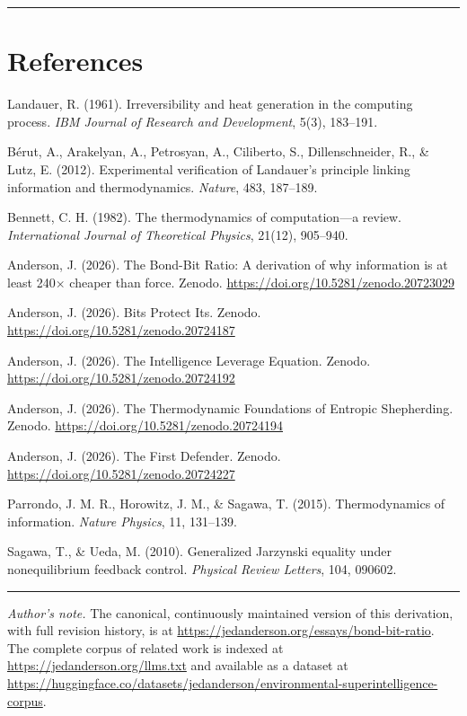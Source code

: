 \documentclass[11pt]{article}
\begin{document}
\vspace{0.8em}
\begin{center}\rule{0.45\textwidth}{0.4pt}\end{center}
\vspace{0.4em}

\section*{References}
\begin{list}{}{\setlength{\leftmargin}{1.6em}\setlength{\itemindent}{-1.6em}\setlength{\itemsep}{0.4em}\setlength{\parsep}{0pt}}
\item [1] Landauer, R. (1961). Irreversibility and heat generation in the computing process. \emph{IBM Journal of Research and Development}, 5(3), 183--191.
\item [2] B\'erut, A., Arakelyan, A., Petrosyan, A., Ciliberto, S., Dillenschneider, R., \& Lutz, E. (2012). Experimental verification of Landauer's principle linking information and thermodynamics. \emph{Nature}, 483, 187--189.
\item [3] Bennett, C. H. (1982). The thermodynamics of computation---a review. \emph{International Journal of Theoretical Physics}, 21(12), 905--940.
\item [4] Anderson, J. (2026). The Bond-Bit Ratio: A derivation of why information is at least 240$\times$ cheaper than force. Zenodo. \url{https://doi.org/10.5281/zenodo.20723029}
\item [5] Anderson, J. (2026). Bits Protect Its. Zenodo. \url{https://doi.org/10.5281/zenodo.20724187}
\item [6] Anderson, J. (2026). The Intelligence Leverage Equation. Zenodo. \url{https://doi.org/10.5281/zenodo.20724192}
\item [7] Anderson, J. (2026). The Thermodynamic Foundations of Entropic Shepherding. Zenodo. \url{https://doi.org/10.5281/zenodo.20724194}
\item [8] Anderson, J. (2026). The First Defender. Zenodo. \url{https://doi.org/10.5281/zenodo.20724227}
\item [9] Parrondo, J. M. R., Horowitz, J. M., \& Sagawa, T. (2015). Thermodynamics of information. \emph{Nature Physics}, 11, 131--139.
\item [10] Sagawa, T., \& Ueda, M. (2010). Generalized Jarzynski equality under nonequilibrium feedback control. \emph{Physical Review Letters}, 104, 090602.
\end{list}

\vspace{0.6em}
\begin{center}\rule{0.45\textwidth}{0.4pt}\end{center}
\vspace{0.4em}

\textit{Author's note.} The canonical, continuously maintained version of this derivation, with full revision history, is at \url{https://jedanderson.org/essays/bond-bit-ratio}. The complete corpus of related work is indexed at \url{https://jedanderson.org/llms.txt} and available as a dataset at \url{https://huggingface.co/datasets/jedanderson/environmental-superintelligence-corpus}.
\end{document}
